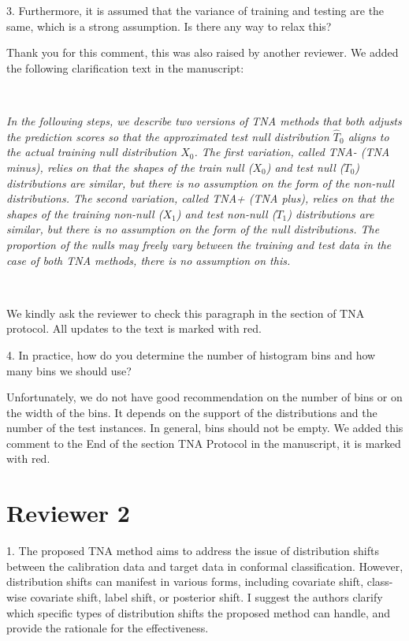 \documentclass{article}
\newcommand{\response}[1]{\vspace*{1ex} \color{blue} \noindent #1 \color{black}
\vspace*{2ex}}
\begin{document}
3. Furthermore, it is assumed that the variance of training and testing are the same, which is a strong assumption. Is there any way to relax this?


\response{Thank you for this comment, this was also raised by another reviewer. We added the following clarification text in the manuscript: 

\ 

{\em In the following steps, we describe two versions of TNA methods that both adjusts the prediction scores so that the approximated test null distribution $\hat{T}_0$ aligns to the actual training null distribution $X_0$. The first variation, called TNA- (TNA minus), relies on that the shapes of the train null ($X_0$) and test null ($T_0$) distributions are similar, but there is no assumption on the form of the non-null distributions. The second variation, called TNA+ (TNA plus), relies on that the shapes of the training non-null ($X_1$) and test non-null ($T_1$) distributions are similar, but there is no assumption on the form of the null distributions. The proportion of the nulls may freely vary between the training and test data in the case of both TNA methods, there is no assumption on this.
}

\ 

We kindly ask the reviewer to check this paragraph in the section of TNA protocol. All updates to the text is marked with red.
}


4. In practice, how do you determine the number of histogram bins and how many bins we should use?

\response{Unfortunately, we do not have good recommendation on the number of bins or on the width of the bins. It depends on the support of the distributions and the number of the test instances. In general, bins should not be empty. We added this comment to the End of the section TNA Protocol in the manuscript, it is marked with red. }

\clearpage 

\section*{Reviewer 2}
1. The proposed TNA method aims to address the issue of distribution shifts between the calibration data and target data in conformal classification.
However, distribution shifts can manifest in various forms, including covariate shift, class-wise covariate shift, label shift, or posterior shift.
I suggest the authors clarify which specific types of distribution shifts the proposed method can handle, and provide the rationale for the effectiveness.
\end{document}
